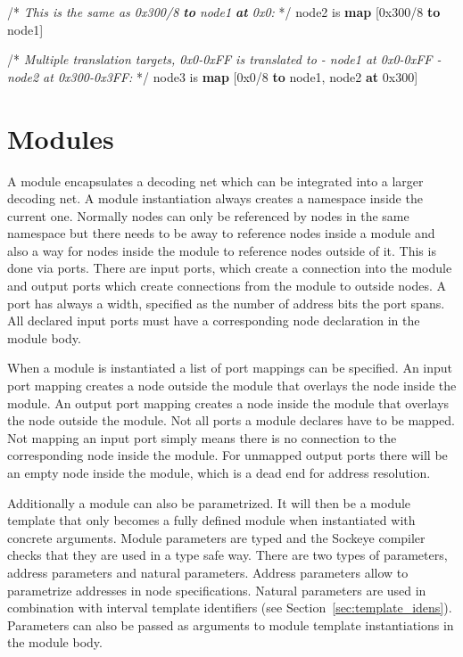 \documentclass[a4paper,11pt,twoside]{report}
\begin{document}
{{{\begin{syntax}
    /* \textit{This is the same as \textup{0x300/8 \textbf{to} node1 \textbf{at} 0x0}:} */
    node2 is \textbf{map} [0x300/8 \textbf{to} node1]

    /* \textit{Multiple translation targets, \textup{0x0-0xFF} is translated to
       - \textup{node1} at \textup{0x0-0xFF}
       - \textup{node2} at \textup{0x300-0x3FF}:} */
    node3 is \textbf{map} [0x0/8 \textbf{to} node1, node2 \textbf{at} 0x300]
\end{syntax}

\section{Modules}
\label{sec:modules}
A module encapsulates a decoding net which can be integrated into a larger decoding net.
A module instantiation always creates a namespace inside the current one.
Normally nodes can only be referenced by nodes in the same namespace but there needs to be away to reference nodes inside a module and also a way for nodes inside the module to reference nodes outside of it.
This is done via ports.
There are input ports, which create a connection into the module and output ports which create connections from the module to outside nodes.
A port has always a width, specified as the number of address bits the port spans.
All declared input ports must have a corresponding node declaration in the module body.

When a module is instantiated a list of port mappings can be specified.
An input port mapping creates a node outside the module that overlays the node inside the module.
An output port mapping creates a node inside the module that overlays the node outside the module.
Not all ports a module declares have to be mapped.
Not mapping an input port simply means there is no connection to the corresponding node inside the module.
For unmapped output ports there will be an empty node inside the module, which is a dead end for address resolution.

Additionally a module can also be parametrized.
It will then be a module template that only becomes a fully defined module when instantiated with concrete arguments.
Module parameters are typed and the Sockeye compiler checks that they are used in a type safe way.
There are two types of parameters, address parameters and natural parameters.
Address parameters allow to parametrize addresses in node specifications.
Natural parameters are used in combination with interval template identifiers (see Section~\ref{sec:template_idens}).
Parameters can also be passed as arguments to module template instantiations in the module body.

}}}
\end{document}

